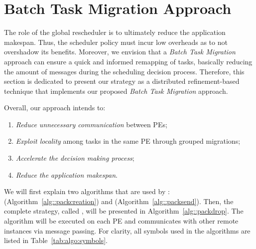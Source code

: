 \section{Batch Task Migration Approach} \label{sec:algo}



The role of the global rescheduler is to ultimately reduce the application makespan. 
Thus, the scheduler policy must incur low overheads as to not overshadow its benefits. 
Moreover, we envision that a \textit{Batch Task Migration} approach can ensure a quick and informed remapping of tasks, basically reducing the amount of messages during the scheduling decision process. 
Therefore, this section is dedicated to present our \packdrop strategy as a distributed refinement-based technique that implements our proposed \textit{Batch Task Migration} approach.

Overall, our approach intends to:

\begin{enumerate}
	\item \textit{Reduce unnecessary communication} between PEs;
	\item \textit{Exploit locality} among tasks in the same PE through grouped migrations;
	\item \textit{Accelerate the decision making process};
	\item \textit{Reduce the application makespan}.
\end{enumerate}

We will first explain two algorithms that are used by \packdrop: \batchassembly (Algorithm~\ref{alg::packcreation}) and \batchsend (Algorithm~\ref{alg::packsend}).
Then, the complete strategy, called \packdrop, will be presented in Algorithm~\ref{alg::packdrop}.
The \packdrop algorithm will be executed on each PE and communicates with other remote \packdrop instances via message passing.
For clarity, all symbols used in the algorithms are listed in Table~\ref{tab:algo:symbols}.

